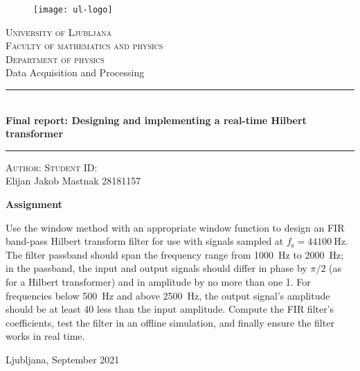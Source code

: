 \thispagestyle{empty}
\begin{center}

    \begin{figure}[htb!]
        \centering
        \texttt{[image: ul-logo]}
    \end{figure}
    \LARGE{\textsc{University of Ljubljana}}\\
    \Large{\textsc{Faculty of {\color{ul-red} mathematics and physics}}}\\[1ex]
    \large{\textsc{Department of physics}}\\
    \vspace{5ex}
    \huge{Data Acquisition and Processing}\\
    \rule{0.9\textwidth}{0.2pt}\\[1ex] \LARGE{\textbf{Final report: Designing and implementing a real-time Hilbert transformer}}
    \rule{0.9\textwidth}{0.2pt}

    \vspace{1ex}

    \begin{minipage}[t]{0.80\textwidth}
        \normalsize{\textsc{Author:}} \hfill \large{\textsc{Student ID}:}\\
    \large{Elijan Jakob Mastnak} \hfill \large{28181157}
    \end{minipage}

\end{center}

\vspace{5ex}
\begin{center}
    \textbf{Assignment}\\[2mm]
    \begin{minipage}[t]{0.80\textwidth}
        Use the window method with an appropriate window function to design an FIR band-pass Hilbert transform filter for use with signals sampled at $ f_{\mathrm{s}} = \SI{44100}{\hertz} $.
        The filter passband should span the frequency range from \SI{1000}{\hertz} to \SI{2000}{\hertz}; in the passband, the input and output signals should differ in phase by $ \pi/2 $ (as for a Hilbert transformer) and in amplitude by no more than one \SI{1}{\decibell}.
        For frequencies below \SI{500}{\hertz} and above \SI{2500}{\hertz}, the output signal's amplitude should be at least \SI{40}{\decibell} less than the input amplitude.
        Compute the FIR filter's coefficients, test the filter in an offline simulation, and finally ensure the filter works in real time.
        
    \end{minipage}

    \vfill
    \large{Ljubljana, September 2021}
\end{center}
